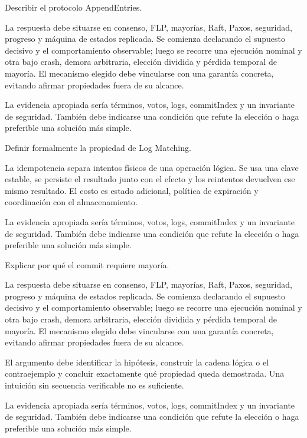 \documentclass[variant=guia,cover=institutional,mode=screen]{ua-engineering-v6-article}
\begin{document}
\begin{uaexercise}
Describir el protocolo AppendEntries.
\end{uaexercise}
\begin{uaanswer}
La respuesta debe situarse en consenso, FLP, mayorías, Raft, Paxos, seguridad, progreso y máquina de estados replicada. Se comienza declarando el supuesto decisivo y el comportamiento observable; luego se recorre una ejecución nominal y otra bajo crash, demora arbitraria, elección dividida y pérdida temporal de mayoría. El mecanismo elegido debe vincularse con una garantía concreta, evitando afirmar propiedades fuera de su alcance.

La evidencia apropiada sería términos, votos, logs, commitIndex y un invariante de seguridad. También debe indicarse una condición que refute la elección o haga preferible una solución más simple.
\end{uaanswer}

\begin{uaexercise}
Definir formalmente la propiedad de Log Matching.
\end{uaexercise}
\begin{uaanswer}
La idempotencia separa intentos físicos de una operación lógica. Se usa una clave estable, se persiste el resultado junto con el efecto y los reintentos devuelven ese mismo resultado. El costo es estado adicional, política de expiración y coordinación con el almacenamiento.

La evidencia apropiada sería términos, votos, logs, commitIndex y un invariante de seguridad. También debe indicarse una condición que refute la elección o haga preferible una solución más simple.
\end{uaanswer}

\begin{uaexercise}
Explicar por qué el commit requiere mayoría.
\end{uaexercise}
\begin{uaanswer}
La respuesta debe situarse en consenso, FLP, mayorías, Raft, Paxos, seguridad, progreso y máquina de estados replicada. Se comienza declarando el supuesto decisivo y el comportamiento observable; luego se recorre una ejecución nominal y otra bajo crash, demora arbitraria, elección dividida y pérdida temporal de mayoría. El mecanismo elegido debe vincularse con una garantía concreta, evitando afirmar propiedades fuera de su alcance.

El argumento debe identificar la hipótesis, construir la cadena lógica o el contraejemplo y concluir exactamente qué propiedad queda demostrada. Una intuición sin secuencia verificable no es suficiente.

La evidencia apropiada sería términos, votos, logs, commitIndex y un invariante de seguridad. También debe indicarse una condición que refute la elección o haga preferible una solución más simple.
\end{uaanswer}
\end{document}
